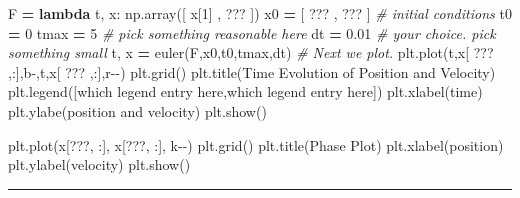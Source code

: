 \documentclass[
]{book}
\newenvironment{Shaded}{\begin{snugshade}}{\end{snugshade}}
\newcommand{\CommentTok}[1]{\textcolor[rgb]{0.56,0.35,0.01}{\textit{#1}}}
\newcommand{\DecValTok}[1]{\textcolor[rgb]{0.00,0.00,0.81}{#1}}
\newcommand{\FloatTok}[1]{\textcolor[rgb]{0.00,0.00,0.81}{#1}}
\newcommand{\KeywordTok}[1]{\textcolor[rgb]{0.13,0.29,0.53}{\textbf{#1}}}
\newcommand{\NormalTok}[1]{#1}
\newcommand{\OperatorTok}[1]{\textcolor[rgb]{0.81,0.36,0.00}{\textbf{#1}}}
\newcommand{\StringTok}[1]{\textcolor[rgb]{0.31,0.60,0.02}{#1}}
\theoremstyle{definition}
\theoremstyle{definition}
\theoremstyle{definition}
\theoremstyle{remark}
\begin{document}
\begin{Shaded}
\begin{Highlighting}[]
\NormalTok{F }\OperatorTok{=} \KeywordTok{lambda}\NormalTok{ t, x: np.array([ x[}\DecValTok{1}\NormalTok{] , ??? ])}
\NormalTok{x0 }\OperatorTok{=}\NormalTok{ [ ??? , ??? ] }\CommentTok{\# initial conditions}
\NormalTok{t0 }\OperatorTok{=} \DecValTok{0}
\NormalTok{tmax }\OperatorTok{=} \DecValTok{5} \CommentTok{\# pick something reasonable here}
\NormalTok{dt }\OperatorTok{=} \FloatTok{0.01} \CommentTok{\# your choice.  pick something small}
\NormalTok{t, x }\OperatorTok{=}\NormalTok{ euler(F,x0,t0,tmax,dt)}
\CommentTok{\# Next we plot.  }
\NormalTok{plt.plot(t,x[ ??? ,:],}\StringTok{\textquotesingle{}b{-}\textquotesingle{}}\NormalTok{,t,x[ ??? ,:],}\StringTok{\textquotesingle{}r{-}{-}\textquotesingle{}}\NormalTok{)}
\NormalTok{plt.grid()}
\NormalTok{plt.title(}\StringTok{\textquotesingle{}Time Evolution of Position and Velocity\textquotesingle{}}\NormalTok{)}
\NormalTok{plt.legend([}\StringTok{\textquotesingle{}which legend entry here\textquotesingle{}}\NormalTok{,}\StringTok{\textquotesingle{}which legend entry here\textquotesingle{}}\NormalTok{])}
\NormalTok{plt.xlabel(}\StringTok{\textquotesingle{}time\textquotesingle{}}\NormalTok{)}
\NormalTok{plt.ylabe(}\StringTok{\textquotesingle{}position and velocity\textquotesingle{}}\NormalTok{)}
\NormalTok{plt.show()}

\NormalTok{plt.plot(x[???, :], x[???, :], }\StringTok{\textquotesingle{}k{-}{-}\textquotesingle{}}\NormalTok{)}
\NormalTok{plt.grid()}
\NormalTok{plt.title(}\StringTok{\textquotesingle{}Phase Plot\textquotesingle{}}\NormalTok{)}
\NormalTok{plt.xlabel(}\StringTok{\textquotesingle{}position\textquotesingle{}}\NormalTok{)}
\NormalTok{plt.ylabel(}\StringTok{\textquotesingle{}velocity\textquotesingle{}}\NormalTok{)}
\NormalTok{plt.show()}
\end{Highlighting}
\end{Shaded}

\begin{center}\rule{0.5\linewidth}{0.5pt}\end{center}
\end{document}
